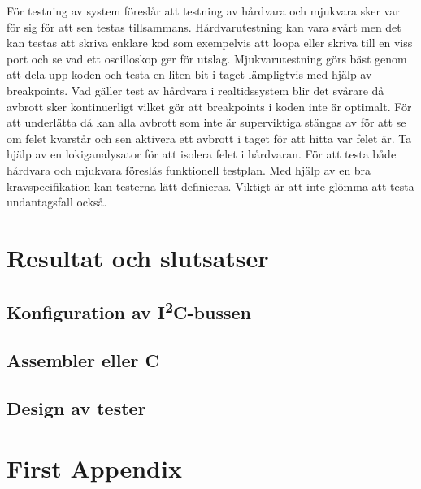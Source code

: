 \documentclass[11pt]{article}
\begin{document}
\begin{flushleft}
För testning av system föreslår \cite{RWD} att testning av hårdvara och mjukvara sker var för sig för att sen testas tillsammans. Hårdvarutestning kan vara svårt men det kan testas att skriva enklare kod som exempelvis att loopa eller skriva till en viss port och se vad ett oscilloskop ger för utslag. Mjukvarutestning görs bäst genom att dela upp koden och testa en liten bit i taget lämpligtvis med hjälp av breakpoints. Vad gäller test av hårdvara i realtidssystem blir det svårare då avbrott sker kontinuerligt vilket gör att breakpoints i koden inte är optimalt. För att underlätta då kan alla avbrott som inte är superviktiga stängas av för att se om felet kvarstår och sen aktivera ett avbrott i taget för att hitta var felet är. Ta hjälp av en lokiganalysator för att isolera felet i hårdvaran. För att testa både hårdvara och mjukvara föreslås funktionell testplan. Med hjälp av en bra kravspecifikation kan testerna lätt definieras. Viktigt är att inte glömma att testa undantagsfall också.

\pagebreak

\section{Resultat och slutsatser}

\subsection{Konfiguration av I\textsuperscript{2}C-bussen}

\subsection{Assembler eller C}

\subsection{Design av tester}

\pagebreak
{}



\pagebreak
\appendix
\section{First Appendix}

\end{flushleft}
\end{document}
